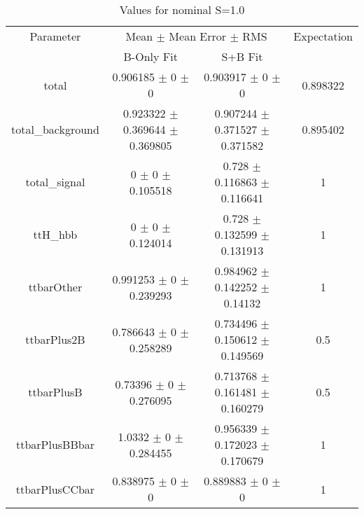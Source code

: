 \begin{table}
\centering
\caption{Values for nominal S=1.0}
\begin{tabular}{cccc}
\toprule
Parameter & \multicolumn{2}{c}{Mean $\pm$ Mean Error $\pm$ RMS} & Expectation\\
 & B-Only Fit & S+B Fit & \\
\midrule
total & \num{0.906185} $\pm$ \num{0} $\pm$ \num{0} & \num{0.903917} $\pm$ \num{0} $\pm$ \num{0} & \num{0.898322}\\
total\_background & \num{0.923322} $\pm$ \num{0.369644} $\pm$ \num{0.369805} & \num{0.907244} $\pm$ \num{0.371527} $\pm$ \num{0.371582} & \num{0.895402}\\
total\_signal & \num{0} $\pm$ \num{0} $\pm$ \num{0.105518} & \num{0.728} $\pm$ \num{0.116863} $\pm$ \num{0.116641} & \num{1}\\
ttH\_hbb & \num{0} $\pm$ \num{0} $\pm$ \num{0.124014} & \num{0.728} $\pm$ \num{0.132599} $\pm$ \num{0.131913} & \num{1}\\
ttbarOther & \num{0.991253} $\pm$ \num{0} $\pm$ \num{0.239293} & \num{0.984962} $\pm$ \num{0.142252} $\pm$ \num{0.14132} & \num{1}\\
ttbarPlus2B & \num{0.786643} $\pm$ \num{0} $\pm$ \num{0.258289} & \num{0.734496} $\pm$ \num{0.150612} $\pm$ \num{0.149569} & \num{0.5}\\
ttbarPlusB & \num{0.73396} $\pm$ \num{0} $\pm$ \num{0.276095} & \num{0.713768} $\pm$ \num{0.161481} $\pm$ \num{0.160279} & \num{0.5}\\
ttbarPlusBBbar & \num{1.0332} $\pm$ \num{0} $\pm$ \num{0.284455} & \num{0.956339} $\pm$ \num{0.172023} $\pm$ \num{0.170679} & \num{1}\\
ttbarPlusCCbar & \num{0.838975} $\pm$ \num{0} $\pm$ \num{0} & \num{0.889883} $\pm$ \num{0} $\pm$ \num{0} & \num{1}\\
\bottomrule
\end{tabular}
\end{table}